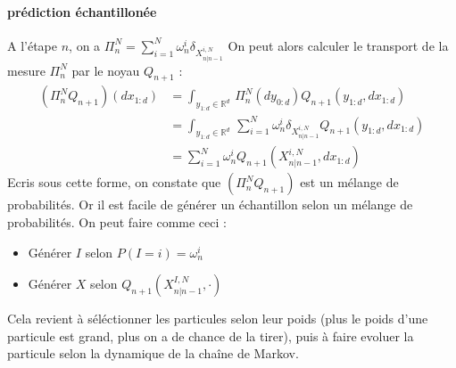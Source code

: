 \documentclass{article}
\begin{document}
\paragraph{prédiction échantillonée}
A l'étape $n$, on a $\Pi_{n}^N= \sum_{i=1}^{N}\omega_n^i\delta_{X_{n \vert n-1}^{i,N}}$
On peut alors calculer le transport de la mesure $\Pi_n^N$ par le noyau $Q_{n+1}$ : 
\begin{align*}
   (\Pi_n^N Q_{n+1})(dx_{1:d}) &=\displaystyle{\int_{y_{1:d}\in \mathbb{R}^d}\,\Pi_n^N(dy_{0:d})Q_{n+1}(y_{1:d},dx_{1:d})}\\
   &=\displaystyle{\int_{y_{1:d}\in \mathbb{R}^d}\,\sum_{i=1}^N \omega_n^i \delta_{X_{n \vert n-1}^{i,N}}Q_{n+1}(y_{1:d},dx_{1:d})}\\
   &=\sum_{i=1}^N \omega_n^i Q_{n+1}(X_{n \vert n-1}^{i,N},dx_{1:d})
\end{align*}
Ecris sous cette forme, on constate que $(\Pi_n^N Q_{n+1})$ est un mélange de probabilités. Or il est facile de générer
un échantillon selon un mélange de probabilités. On peut faire comme ceci : 
\begin{itemize}
   \item Générer $I$ selon $P(I=i)=\omega^i_n$
   \item Générer $X$ selon $Q_{n+1}(X_{n\vert n-1}^{I,N},\cdot)$
\end{itemize}
Cela revient à séléctionner les particules selon leur poids (plus le poids d'une 
particule est grand, plus on a de chance de la tirer), puis à faire evoluer la particule 
selon la dynamique de la chaîne de Markov.
\end{document}
